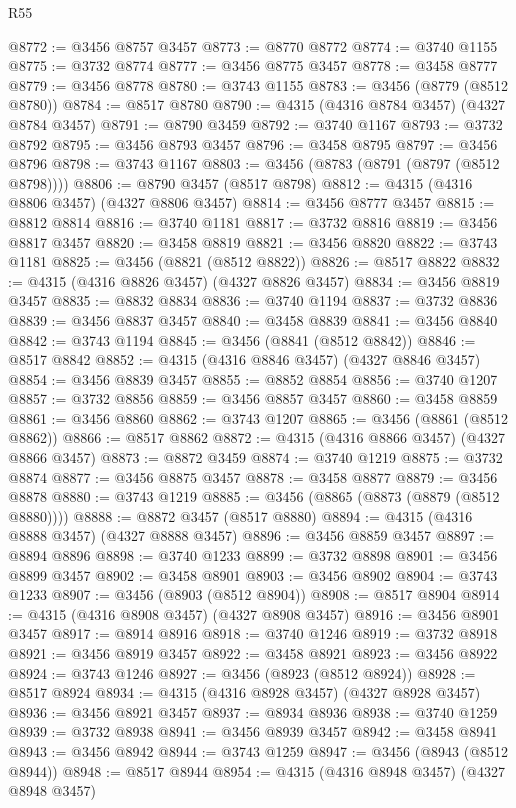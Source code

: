 \begin{lexlean}{R55}
\begin{coremodule}
@8772 := @3456 @8757 @3457
@8773 := @8770 @8772
@8774 := @3740 @1155
@8775 := @3732 @8774
@8777 := @3456 @8775 @3457
@8778 := @3458 @8777
@8779 := @3456 @8778
@8780 := @3743 @1155
@8783 := @3456 (@8779 (@8512 @8780))
@8784 := @8517 @8780
@8790 := @4315 (@4316 @8784 @3457) (@4327 @8784 @3457)
@8791 := @8790 @3459
@8792 := @3740 @1167
@8793 := @3732 @8792
@8795 := @3456 @8793 @3457
@8796 := @3458 @8795
@8797 := @3456 @8796
@8798 := @3743 @1167
@8803 := @3456 (@8783 (@8791 (@8797 (@8512 @8798))))
@8806 := @8790 @3457 (@8517 @8798)
@8812 := @4315 (@4316 @8806 @3457) (@4327 @8806 @3457)
@8814 := @3456 @8777 @3457
@8815 := @8812 @8814
@8816 := @3740 @1181
@8817 := @3732 @8816
@8819 := @3456 @8817 @3457
@8820 := @3458 @8819
@8821 := @3456 @8820
@8822 := @3743 @1181
@8825 := @3456 (@8821 (@8512 @8822))
@8826 := @8517 @8822
@8832 := @4315 (@4316 @8826 @3457) (@4327 @8826 @3457)
@8834 := @3456 @8819 @3457
@8835 := @8832 @8834
@8836 := @3740 @1194
@8837 := @3732 @8836
@8839 := @3456 @8837 @3457
@8840 := @3458 @8839
@8841 := @3456 @8840
@8842 := @3743 @1194
@8845 := @3456 (@8841 (@8512 @8842))
@8846 := @8517 @8842
@8852 := @4315 (@4316 @8846 @3457) (@4327 @8846 @3457)
@8854 := @3456 @8839 @3457
@8855 := @8852 @8854
@8856 := @3740 @1207
@8857 := @3732 @8856
@8859 := @3456 @8857 @3457
@8860 := @3458 @8859
@8861 := @3456 @8860
@8862 := @3743 @1207
@8865 := @3456 (@8861 (@8512 @8862))
@8866 := @8517 @8862
@8872 := @4315 (@4316 @8866 @3457) (@4327 @8866 @3457)
@8873 := @8872 @3459
@8874 := @3740 @1219
@8875 := @3732 @8874
@8877 := @3456 @8875 @3457
@8878 := @3458 @8877
@8879 := @3456 @8878
@8880 := @3743 @1219
@8885 := @3456 (@8865 (@8873 (@8879 (@8512 @8880))))
@8888 := @8872 @3457 (@8517 @8880)
@8894 := @4315 (@4316 @8888 @3457) (@4327 @8888 @3457)
@8896 := @3456 @8859 @3457
@8897 := @8894 @8896
@8898 := @3740 @1233
@8899 := @3732 @8898
@8901 := @3456 @8899 @3457
@8902 := @3458 @8901
@8903 := @3456 @8902
@8904 := @3743 @1233
@8907 := @3456 (@8903 (@8512 @8904))
@8908 := @8517 @8904
@8914 := @4315 (@4316 @8908 @3457) (@4327 @8908 @3457)
@8916 := @3456 @8901 @3457
@8917 := @8914 @8916
@8918 := @3740 @1246
@8919 := @3732 @8918
@8921 := @3456 @8919 @3457
@8922 := @3458 @8921
@8923 := @3456 @8922
@8924 := @3743 @1246
@8927 := @3456 (@8923 (@8512 @8924))
@8928 := @8517 @8924
@8934 := @4315 (@4316 @8928 @3457) (@4327 @8928 @3457)
@8936 := @3456 @8921 @3457
@8937 := @8934 @8936
@8938 := @3740 @1259
@8939 := @3732 @8938
@8941 := @3456 @8939 @3457
@8942 := @3458 @8941
@8943 := @3456 @8942
@8944 := @3743 @1259
@8947 := @3456 (@8943 (@8512 @8944))
@8948 := @8517 @8944
@8954 := @4315 (@4316 @8948 @3457) (@4327 @8948 @3457)

\end{coremodule}
\end{lexlean}
